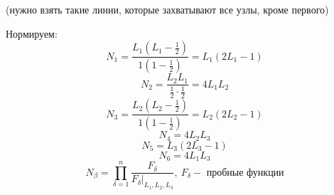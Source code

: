 \documentclass{bmstu}
\begin{document}
(нужно взять такие линии, которые захватывают все узлы, кроме первого)

Нормируем:
\[N_1 = \frac{L_1 \left(L_1 - \displaystyle\frac{1}{2}\right)}{1 \left(1 - \displaystyle\frac{1}{2}\right)} = L_1 (2L_1 - 1)\]
\[N_2 = \frac{L_2L_1}{\displaystyle\frac{1}{2} \cdot \frac{1}{2}} = 4L_1L_2\]
\[N_3 = \frac{L_2 \left(L_2 - \displaystyle\frac{1}{2}\right)}{1 \left(1 - \displaystyle\frac{1}{2}\right)} = L_2 (2L_2 - 1)\]
\[N_4 = 4L_2L_3\]
\[N_5 = L_3(2L_3 - 1)\]
\[N_6 = 4L_1L_3\]
\[N_{\beta} = \prod_{\delta=1}^n \frac{F_{\delta}}{F_{\delta} |_{L_1,L_2,L_3}},\ F_{\delta} - \text{ пробные функции}\]
\end{document}
